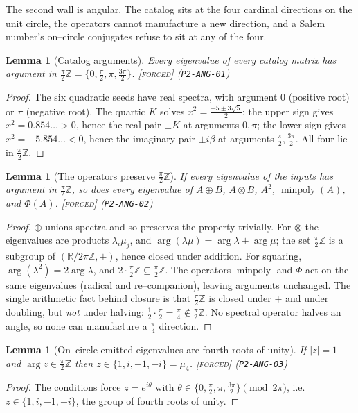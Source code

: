\documentclass[11pt]{article}
\theoremstyle{plain}
\newtheorem{lemma}[theorem]{Lemma}
\theoremstyle{definition}
\theoremstyle{remark}
\newcommand{\forced}{\textcolor{forcedc}{\textsc{[forced]}}}
\newcommand{\R}{\mathbb{R}}
\newcommand{\Z}{\mathbb{Z}}
\newcommand{\abs}[1]{\left\lvert #1 \right\rvert}
\begin{document}
The second wall is angular. The catalog sits at the four cardinal directions on the unit circle, the operators cannot manufacture a new direction, and a Salem number's on--circle conjugates refuse to sit at any of the four.

\begin{lemma}[Catalog arguments]\label{lem:catargs}
Every eigenvalue of every catalog matrix has argument in $\tfrac{\pi}{2}\Z=\{0,\tfrac\pi2,\pi,\tfrac{3\pi}2\}$. \forced{} {\small(\texttt{P2-ANG-01})}
\end{lemma}
\begin{proof}
The six quadratic seeds have real spectra, with argument $0$ (positive root) or $\pi$ (negative root). The quartic $K$ solves $x^2=\tfrac{-5\pm3\sqrt5}2$: the upper sign gives $x^2=0.854\ldots>0$, hence the real pair $\pm K$ at arguments $0,\pi$; the lower sign gives $x^2=-5.854\ldots<0$, hence the imaginary pair $\pm i\beta$ at arguments $\tfrac\pi2,\tfrac{3\pi}2$. All four lie in $\tfrac\pi2\Z$.
\end{proof}

\begin{lemma}[The operators preserve $\tfrac\pi2\Z$]\label{lem:closure}
If every eigenvalue of the inputs has argument in $\tfrac\pi2\Z$, so does every eigenvalue of $A\oplus B$, $A\otimes B$, $A^2$, $\operatorname{minpoly}(A)$, and $\Phi(A)$. \forced{} {\small(\texttt{P2-ANG-02})}
\end{lemma}
\begin{proof}
$\oplus$ unions spectra and so preserves the property trivially. For $\otimes$ the eigenvalues are products $\lambda_i\mu_j$, and $\arg(\lambda\mu)=\arg\lambda+\arg\mu$; the set $\tfrac\pi2\Z$ is a subgroup of $(\R/2\pi\Z,+)$, hence closed under addition. For squaring, $\arg(\lambda^2)=2\arg\lambda$, and $2\cdot\tfrac\pi2\Z\subseteq\tfrac\pi2\Z$. The operators $\operatorname{minpoly}$ and $\Phi$ act on the same eigenvalues (radical and re--companion), leaving arguments unchanged. The single arithmetic fact behind closure is that $\tfrac\pi2\Z$ is closed under $+$ and under doubling, but \emph{not} under halving: $\tfrac12\cdot\tfrac\pi2=\tfrac\pi4\notin\tfrac\pi2\Z$. No spectral operator halves an angle, so none can manufacture a $\tfrac\pi4$ direction.
\end{proof}

\begin{lemma}[On--circle emitted eigenvalues are fourth roots of unity]\label{lem:oncircle}
If $\abs z=1$ and $\arg z\in\tfrac\pi2\Z$ then $z\in\{1,i,-1,-i\}=\mu_4$. \forced{} {\small(\texttt{P2-ANG-03})}
\end{lemma}
\begin{proof}
The conditions force $z=e^{i\theta}$ with $\theta\in\{0,\tfrac\pi2,\pi,\tfrac{3\pi}2\}\pmod{2\pi}$, i.e.\ $z\in\{1,i,-1,-i\}$, the group of fourth roots of unity.
\end{proof}
\end{document}
